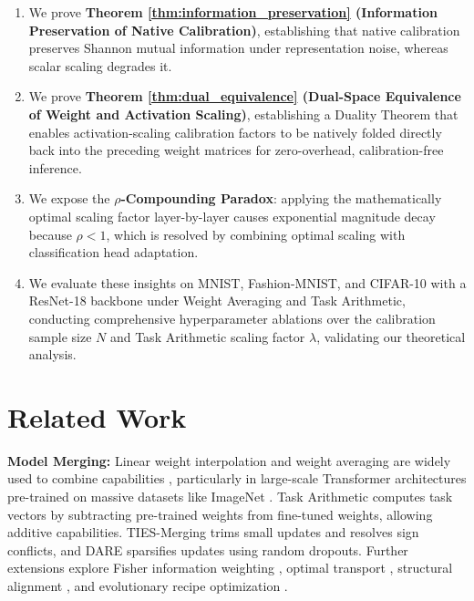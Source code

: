 \documentclass{article}
\theoremstyle{plain}
\theoremstyle{definition}
\theoremstyle{remark}
\begin{document}
\begin{enumerate}
    \item We prove \textbf{Theorem \ref{thm:information_preservation} (Information Preservation of Native Calibration)}, establishing that native calibration preserves Shannon mutual information under representation noise, whereas scalar scaling degrades it.
    \item We prove \textbf{Theorem \ref{thm:dual_equivalence} (Dual-Space Equivalence of Weight and Activation Scaling)}, establishing a Duality Theorem that enables activation-scaling calibration factors to be natively folded directly back into the preceding weight matrices for zero-overhead, calibration-free inference.
    \item We expose the \textbf{$\rho$-Compounding Paradox}: applying the mathematically optimal scaling factor layer-by-layer causes exponential magnitude decay because $\rho < 1$, which is resolved by combining optimal scaling with classification head adaptation.
    \item We evaluate these insights on MNIST, Fashion-MNIST, and CIFAR-10 with a ResNet-18 backbone under Weight Averaging and Task Arithmetic, conducting comprehensive hyperparameter ablations over the calibration sample size $N$ and Task Arithmetic scaling factor $\lambda$, validating our theoretical analysis.
\end{enumerate}

\section{Related Work}
\textbf{Model Merging:} Linear weight interpolation and weight averaging are widely used to combine capabilities \cite{singh2020model, wang2020federated, wortsman2022model, choshen24fusing}, particularly in large-scale Transformer architectures \cite{vaswani2017attention} pre-trained on massive datasets like ImageNet \cite{deng2009imagenet}. Task Arithmetic \cite{ilharco2023editing} computes task vectors by subtracting pre-trained weights from fine-tuned weights, allowing additive capabilities. TIES-Merging \cite{yadav2023ties} trims small updates and resolves sign conflicts, and DARE \cite{yu2024language} sparsifies updates using random dropouts. Further extensions explore Fisher information weighting \cite{matena2022merging}, optimal transport \cite{singh2020model}, structural alignment \cite{stoica24zipit}, and evolutionary recipe optimization \cite{akiba2024evolutionary}.
\end{document}
